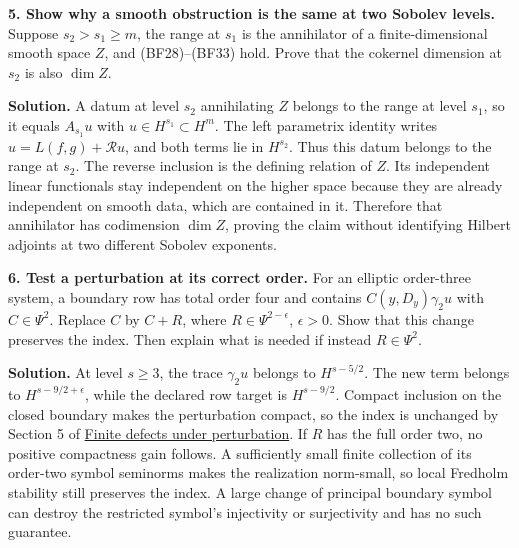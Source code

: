 \documentclass[
  11pt,
]{article}
\makeatletter
\let\ReaderOriginalAnchorStart\hyper@anchorstart
\let\ReaderOriginalAnchorEnd\hyper@anchorend
\let\ReaderPendingAliases\@empty
\def\ReaderArmAliases#1{\gdef\ReaderPendingAliases{#1}}
\def\hyper@anchorstart#1{\ReaderIfNativeAnchorTF{#1}{\ReaderPendingAliases\global\let\ReaderPendingAliases\@empty}{}\ReaderOriginalAnchorStart{#1}}
\makeatother
\begin{document}
\textbf{5. Show why a smooth obstruction is the same at two Sobolev
levels.} Suppose \(s_2>s_1\geq m\), the range at \(s_1\) is the
annihilator of a finite-dimensional smooth space \(Z\), and
(BF28)--(BF33) hold. Prove that the cokernel dimension at \(s_2\) is
also \(\dim Z\).

\textbf{Solution.} A datum at level \(s_2\) annihilating \(Z\) belongs
to the range at level \(s_1\), so it equals \(A_{s_1}u\) with
\(u\in H^{s_1}\subset H^m\). The left parametrix identity writes
\(u=L(f,g)+\mathcal R u\), and both terms lie in \(H^{s_2}\). Thus this
datum belongs to the range at \(s_2\). The reverse inclusion is the
defining relation of \(Z\). Its independent linear functionals stay
independent on the higher space because they are already independent on
smooth data, which are contained in it. Therefore that annihilator has
codimension \(\dim Z\), proving the claim without identifying Hilbert
adjoints at two different Sobolev exponents.

\textbf{6. Test a perturbation at its correct order.} For an elliptic
order-three system, a boundary row has total order four and contains
\(C(y,D_y)\gamma_2u\) with \(C\in\Psi^2\). Replace \(C\) by \(C+R\),
where \(R\in\Psi^{2-\epsilon}\), \(\epsilon>0\). Show that this change
preserves the index. Then explain what is needed if instead
\(R\in\Psi^2\).

\textbf{Solution.} At level \(s\geq3\), the trace \(\gamma_2u\) belongs
to \(H^{s-5/2}\). The new term belongs to \(H^{s-9/2+\epsilon}\), while
the declared row target is \(H^{s-9/2}\). Compact inclusion on the
closed boundary makes the perturbation compact, so the index is
unchanged by Section 5 of \href{fredholm-stability.pdf}{Finite defects
under perturbation}. If \(R\) has the full order two, no positive
compactness gain follows. A sufficiently small finite collection of its
order-two symbol seminorms makes the realization norm-small, so local
Fredholm stability still preserves the index. A large change of
principal boundary symbol can destroy the restricted symbol's
injectivity or surjectivity and has no such guarantee.

\ReaderArmAliases{\ReaderOriginalAnchorStart{AN03-GFB-014}\ReaderOriginalAnchorEnd\begingroup\expandafter\def\csname @currentHref\endcsname{AN03-GFB-014}\label{AN03-GFB-014}\endgroup\ReaderOriginalAnchorStart{an03-gfb-014-dependencies-comparison-readings-and-further-questions}\ReaderOriginalAnchorEnd\begingroup\expandafter\def\csname @currentHref\endcsname{an03-gfb-014-dependencies-comparison-readings-and-further-questions}\label{an03-gfb-014-dependencies-comparison-readings-and-further-questions}\endgroup\ReaderOriginalAnchorStart{16-further-questions-and-references}\ReaderOriginalAnchorEnd\begingroup\expandafter\def\csname @currentHref\endcsname{16-further-questions-and-references}\label{16-further-questions-and-references}\endgroup\ReaderOriginalAnchorStart{further-questions-and-references}\ReaderOriginalAnchorEnd}
\end{document}
